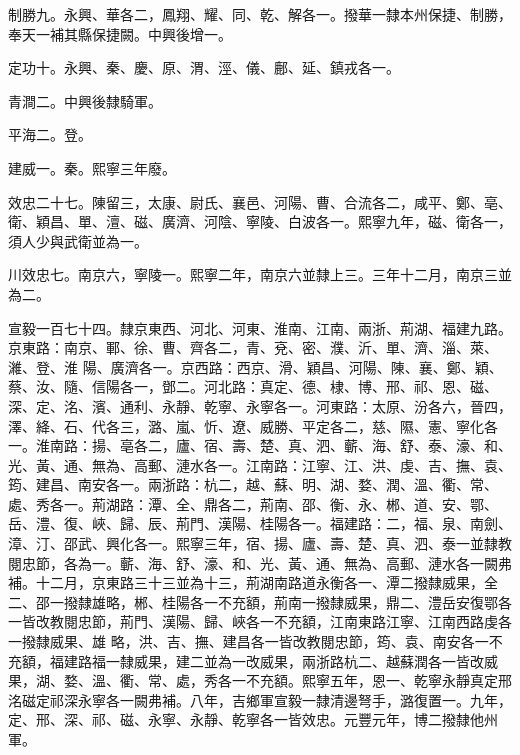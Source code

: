 \begin{pinyinscope}
 制勝九。永興、華各二，鳳翔、耀、同、乾、解各一。撥華一隸本州保捷、制勝，奉天一補其縣保捷闕。中興後增一。



 定功十。永興、秦、慶、原、渭、涇、儀、鄜、延、鎮戎各一。



 青澗二。中興後隸騎軍。



 平海二。登。



 建威一。秦。熙寧三年廢。



 效忠二十七。陳留三，太康、尉氏、襄邑、河陽、曹、合流各二，咸平、鄭、亳、衛、穎昌、單、澶、磁、廣濟、河陰、寧陵、白波各一。熙寧九年，磁、衛各一，須人少與武衛並為一。



 川效忠七。南京六，寧陵一。熙寧二年，南京六並隸上三。三年十二月，南京三並為二。



 宣毅一百七十四。隸京東西、河北、河東、淮南、江南、兩浙、荊湖、福建九路。京東路：南京、鄆、徐、曹、齊各二，青、兗、密、濮、沂、單、濟、淄、萊、濰、登、淮
 陽、廣濟各一。京西路：西京、滑、穎昌、河陽、陳、襄、鄭、穎、蔡、汝、隨、信陽各一，鄧二。河北路：真定、德、棣、博、邢、祁、恩、磁、深、定、洺、濱、通利、永靜、乾寧、永寧各一。河東路：太原、汾各六，晉四，澤、絳、石、代各三，潞、嵐、忻、遼、威勝、平定各二，慈、隰、憲、寧化各一。淮南路：揚、亳各二，廬、宿、壽、楚、真、泗、蘄、海、舒、泰、濠、和、光、黃、通、無為、高郵、漣水各一。江南路：江寧、江、洪、虔、吉、撫、袁、筠、建昌、南安各一。兩浙路：杭二，越、蘇、明、湖、婺、潤、溫、衢、常、處、秀各一。荊湖路：潭、全、鼎各二，荊南、邵、衡、永、郴、道、安、鄂、岳、澧、復、峽、歸、辰、荊門、漢陽、桂陽各一。福建路：二，福、泉、南劍、漳、汀、邵武、興化各一。熙寧三年，宿、揚、廬、壽、楚、真、泗、泰一並隸教閱忠節，各為一。蘄、海、舒、濠、和、光、黃、通、無為、高郵、漣水各一闕弗補。十二月，京東路三十三並為十三，荊湖南路道永衡各一、潭二撥隸威果，全二、邵一撥隸雄略，郴、桂陽各一不充額，荊南一撥隸威果，鼎二、澧岳安復鄂各一皆改教閱忠節，荊門、漢陽、歸、峽各一不充額，江南東路江寧、江南西路虔各一撥隸威果、雄
 略，洪、吉、撫、建昌各一皆改教閱忠節，筠、袁、南安各一不充額，福建路福一隸威果，建二並為一改威果，兩浙路杭二、越蘇潤各一皆改威果，湖、婺、溫、衢、常、處，秀各一不充額。熙寧五年，恩一、乾寧永靜真定邢洺磁定祁深永寧各一闕弗補。八年，吉鄉軍宣毅一隸清邊弩手，潞復置一。九年，定、邢、深、祁、磁、永寧、永靜、乾寧各一皆效忠。元豐元年，博二撥隸他州軍。




\end{pinyinscope}

